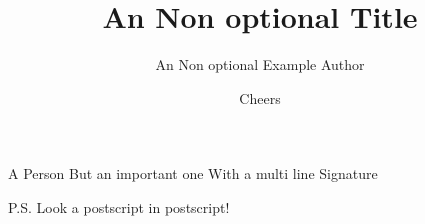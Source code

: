 \documentclass{dragonfly-letter}
\title{An Non optional Title}
\author{An Non optional Example Author}
\begin{document}
\lipsum[1-7]

\signature{Cheers}{
A Person
But an important one
With a multi line
Signature
}

P.S. Look a postscript in postscript!

\end{document}
